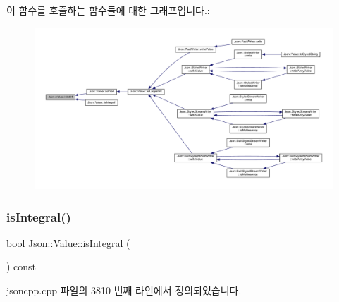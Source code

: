 이 함수를 호출하는 함수들에 대한 그래프입니다.\+:\nopagebreak
\begin{figure}[H]
\begin{center}
\leavevmode
\includegraphics[width=350pt]{class_json_1_1_value_a4a81fb3c3acdbb68b2e2f30836a4f53e_icgraph}
\end{center}
\end{figure}
\mbox{\label{class_json_1_1_value_ab6798954f6e80281cf22708ef45198a7}} 
\subsubsection{\texorpdfstring{is\+Integral()}{isIntegral()}}
{\footnotesize\ttfamily bool Json\+::\+Value\+::is\+Integral (\begin{DoxyParamCaption}{ }\end{DoxyParamCaption}) const}



jsoncpp.\+cpp 파일의 3810 번째 라인에서 정의되었습니다.


